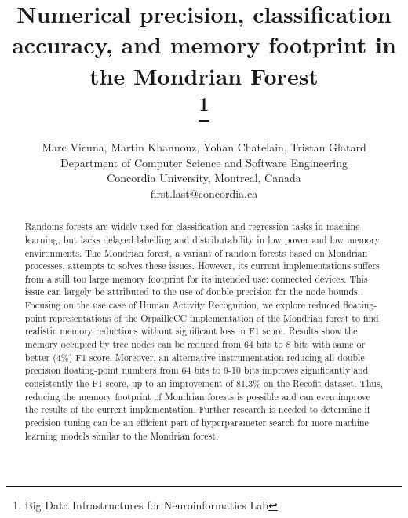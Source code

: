 \documentclass[conference]{IEEEtran}
\newcommand{\Yohan}[1]{\todo[inline,backgroundcolor=green]{YC: #1}}
\begin{document}
\title{Numerical precision, classification accuracy, and memory footprint in the Mondrian Forest\\
\thanks{Big Data Infrastructures for Neuroinformatics Lab}
}

\author{Marc Vicuna, Martin Khannouz, Yohan Chatelain, Tristan Glatard\\
Department of Computer Science and Software Engineering\\
Concordia University, Montreal, Canada\\
first.last@concordia.ca}


\maketitle

\begin{abstract}
    Randoms forests are widely used for classification and regression tasks in machine learning, but lacks delayed labelling and distributability in low power and low memory environments. The Mondrian forest, a variant of random forests based on Mondrian processes, attempts to solves these issues. However, its current implementations suffers from a still too large memory footprint for its intended use: connected devices.  This issue can largely be attributed to the use of double precision for the node bounds.  Focusing on the use case of Human Activity Recognition, we explore reduced floating-point representations of the OrpailleCC implementation of the Mondrian forest to find realistic memory reductions without significant loss in F1 score. Results show the memory occupied by tree nodes can be reduced from 64 bits to 8 bits with same or better (4\%) F1 score. Moreover, an alternative instrumentation reducing all double precision floating-point numbers from 64 bits to 9-10 bits improves significantly and consistently the F1 score, up to an \Yohan{is it true? Wasn't it due to a bug?} improvement of 81.3\% on the Recofit dataset. 
    Thus, reducing the memory footprint of Mondrian forests is possible and can even improve the results of the current implementation. 
    Further research is needed to determine if precision tuning can be an efficient part of hyperparameter search for more machine learning models similar to the Mondrian forest.
\end{abstract}
\end{document}
